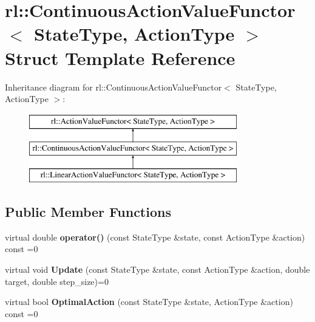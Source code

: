 \hypertarget{structrl_1_1_continuous_action_value_functor}{}\section{rl\+:\+:Continuous\+Action\+Value\+Functor$<$ State\+Type, Action\+Type $>$ Struct Template Reference}
\label{structrl_1_1_continuous_action_value_functor}
Inheritance diagram for rl\+:\+:Continuous\+Action\+Value\+Functor$<$ State\+Type, Action\+Type $>$\+:\begin{figure}[H]
\begin{center}
\leavevmode
\includegraphics[height=3.000000cm]{structrl_1_1_continuous_action_value_functor}
\end{center}
\end{figure}
\subsection*{Public Member Functions}
\begin{DoxyCompactItemize}
\item 
\hypertarget{structrl_1_1_continuous_action_value_functor_a26a7003e2724547484edb8e16c14cea5}{}\label{structrl_1_1_continuous_action_value_functor_a26a7003e2724547484edb8e16c14cea5} 
virtual double {\bfseries operator()} (const State\+Type \&state, const Action\+Type \&action) const =0
\item 
\hypertarget{structrl_1_1_continuous_action_value_functor_af22ee932e1a965c82c73de8574f82254}{}\label{structrl_1_1_continuous_action_value_functor_af22ee932e1a965c82c73de8574f82254} 
virtual void {\bfseries Update} (const State\+Type \&state, const Action\+Type \&action, double target, double step\+\_\+size)=0
\item 
\hypertarget{structrl_1_1_continuous_action_value_functor_ab562f5acc0e1fc7c3dea6673570d3e15}{}\label{structrl_1_1_continuous_action_value_functor_ab562f5acc0e1fc7c3dea6673570d3e15} 
virtual bool {\bfseries Optimal\+Action} (const State\+Type \&state, Action\+Type \&action) const =0
\end{DoxyCompactItemize}


